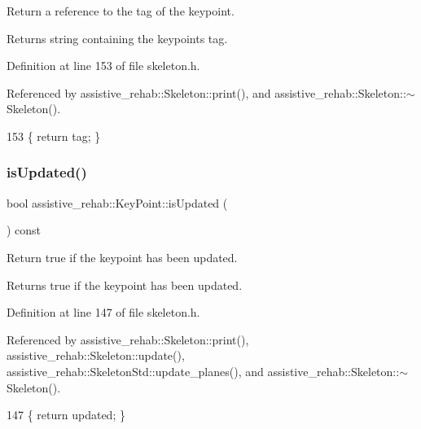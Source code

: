 Return a reference to the tag of the keypoint. 

\begin{DoxyReturn}{Returns}
string containing the keypoint\textquotesingle{}s tag. 
\end{DoxyReturn}


Definition at line 153 of file skeleton.\+h.



Referenced by assistive\+\_\+rehab\+::\+Skeleton\+::print(), and assistive\+\_\+rehab\+::\+Skeleton\+::$\sim$\+Skeleton().


\begin{DoxyCode}
153 \{ \textcolor{keywordflow}{return} tag; \}
\end{DoxyCode}
\mbox{\label{classassistive__rehab_1_1KeyPoint_ab1c339fe8a6dd281534d54bb0fdb3c50}} 
\subsubsection{\texorpdfstring{is\+Updated()}{isUpdated()}}
{\footnotesize\ttfamily bool assistive\+\_\+rehab\+::\+Key\+Point\+::is\+Updated (\begin{DoxyParamCaption}{ }\end{DoxyParamCaption}) const\hspace{0.3cm}{\ttfamily [inline]}}



Return true if the keypoint has been updated. 

\begin{DoxyReturn}{Returns}
true if the keypoint has been updated. 
\end{DoxyReturn}


Definition at line 147 of file skeleton.\+h.



Referenced by assistive\+\_\+rehab\+::\+Skeleton\+::print(), assistive\+\_\+rehab\+::\+Skeleton\+::update(), assistive\+\_\+rehab\+::\+Skeleton\+Std\+::update\+\_\+planes(), and assistive\+\_\+rehab\+::\+Skeleton\+::$\sim$\+Skeleton().


\begin{DoxyCode}
147 \{ \textcolor{keywordflow}{return} updated; \}
\end{DoxyCode}
\mbox{\label{classassistive__rehab_1_1KeyPoint_a6430d1d6b7704a85462de39b6962e48b}} 
